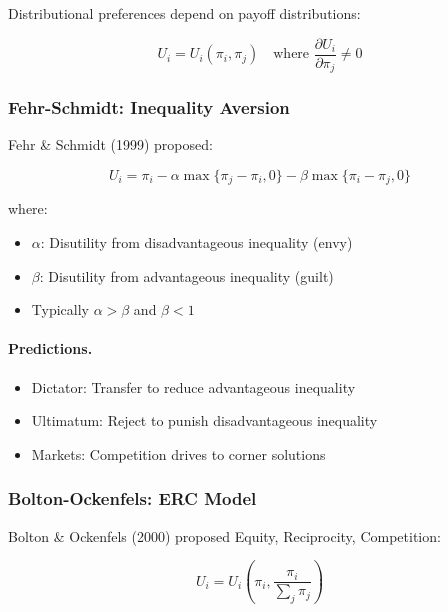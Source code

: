 Distributional preferences depend on payoff distributions:

\begin{equation}
\boxed{
U_i = U_i(\pi_i, \pi_j) \quad \text{where } \frac{\partial U_i}{\partial \pi_j} \neq 0
}
\label{eq:distributional}
\end{equation}

\subsubsection{Fehr-Schmidt: Inequality Aversion}

Fehr \& Schmidt (1999) proposed:

\begin{equation}
\boxed{
U_i = \pi_i - \alpha \max\{\pi_j - \pi_i, 0\} - \beta \max\{\pi_i - \pi_j, 0\}
}
\label{eq:fehr-schmidt}
\end{equation}

where:
\begin{itemize}
    \item $\alpha$: Disutility from disadvantageous inequality (envy)
    \item $\beta$: Disutility from advantageous inequality (guilt)
    \item Typically $\alpha > \beta$ and $\beta < 1$
\end{itemize}

\paragraph{Predictions.}
\begin{itemize}
    \item Dictator: Transfer to reduce advantageous inequality
    \item Ultimatum: Reject to punish disadvantageous inequality
    \item Markets: Competition drives to corner solutions
\end{itemize}

\subsubsection{Bolton-Ockenfels: ERC Model}

Bolton \& Ockenfels (2000) proposed Equity, Reciprocity, Competition:

\begin{equation}
U_i = U_i\left(\pi_i, \frac{\pi_i}{\sum_j \pi_j}\right)
\end{equation}

